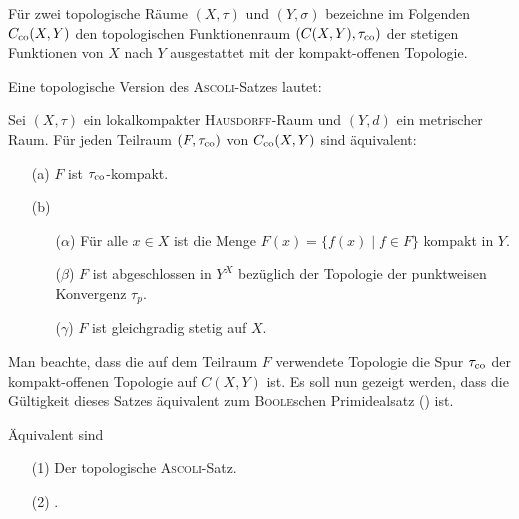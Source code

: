 Für zwei topologische Räume $(X,\tau)$ und $(Y,\sigma)$ bezeichne im Folgenden $C_{\mathrm{co}}(X,Y)$ den topologischen Funktionenraum $(C(X,Y),\tau_{\mathrm{co}})$ der stetigen Funktionen von $X$ nach $Y$ ausgestattet mit der kompakt-offenen Topologie.

Eine topologische Version des \textsc{Ascoli}-Satzes lautet:
\begin{defn}
  Sei $(X,\tau)$ ein lokalkompakter \textsc{Hausdorff}-Raum und $(Y,d)$ ein metrischer Raum.
  Für jeden Teilraum $(F,\tau_{\mathrm{co}})$ von $C_{\mathrm{co}}(X,Y)$ sind äquivalent:
  \begin{enumerate}
    \item[(a)] $F$ ist $\tau_{\mathrm{co}}$-kompakt.
    \item[(b)] \begin{enumerate}
        \item[($\alpha$)] Für alle $x \in X$ ist die Menge $F(x) = \{f(x) \mid f \in F \}$ kompakt in $Y$.
        \item[($\beta$)]  $F$ ist abgeschlossen in $Y^X$ bezüglich der Topologie der punktweisen Konvergenz $\tau_p$.
        \item[($\gamma$)] $F$ ist gleichgradig stetig auf $X$.
      \end{enumerate}
  \end{enumerate}
\end{defn}

Man beachte, dass die auf dem Teilraum $F$ verwendete Topologie die Spur $\tau_{\mathrm{co}}$ der kompakt-offenen Topologie auf $C(X,Y)$ ist.
Es soll nun gezeigt werden, dass die Gültigkeit dieses Satzes äquivalent zum \textsc{Boole}schen Primidealsatz (\PIT) ist.

\begin{thm}
  \label{thm:ascoliPIT}
  Äquivalent sind
  \begin{enumerate}
    \item[(1)] Der topologische \textsc{Ascoli}-Satz.
    \item[(2)] \PIT.
  \end{enumerate}
\end{thm}

